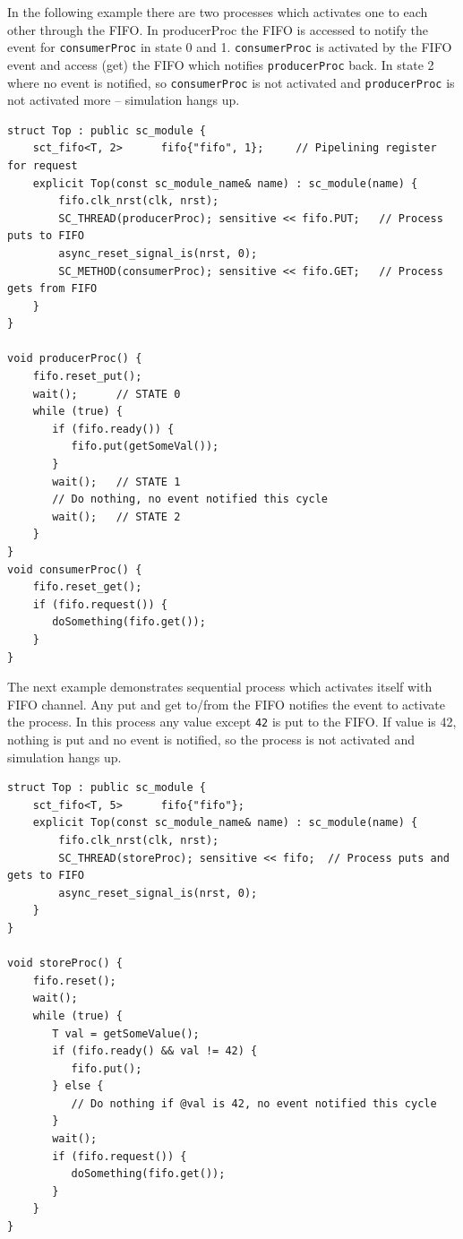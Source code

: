 In the following example there are two processes which activates one to each other through the FIFO. In producerProc the FIFO is accessed to notify the event for {\tt consumerProc} in state 0 and 1. {\tt consumerProc} is activated by the FIFO event and access (get) the FIFO which notifies {\tt producerProc} back. In state 2 where no event is notified, so {\tt consumerProc} is not activated and {\tt producerProc} is not activated more -- simulation hangs up.

\begin{lstlisting}[style=mycpp]
struct Top : public sc_module {
    sct_fifo<T, 2>      fifo{"fifo", 1};     // Pipelining register for request
    explicit Top(const sc_module_name& name) : sc_module(name) {
        fifo.clk_nrst(clk, nrst);
        SC_THREAD(producerProc); sensitive << fifo.PUT;   // Process puts to FIFO
        async_reset_signal_is(nrst, 0);
        SC_METHOD(consumerProc); sensitive << fifo.GET;   // Process gets from FIFO   
    } 
}

void producerProc() {
    fifo.reset_put();
    wait();      // STATE 0
    while (true) {
       if (fifo.ready()) {           
          fifo.put(getSomeVal());
       }
       wait();   // STATE 1
       // Do nothing, no event notified this cycle
       wait();   // STATE 2
    }
}
void consumerProc() {
    fifo.reset_get();
    if (fifo.request()) {
       doSomething(fifo.get());
    }
}
\end{lstlisting}

The next example demonstrates sequential process which activates itself with FIFO channel. Any put and get to/from the FIFO notifies the event to activate the process. In this process any value except {\tt 42} is put to the FIFO. If value is 42, nothing is put and no event is notified, so the process is not activated and simulation hangs up.

\begin{lstlisting}[style=mycpp]
struct Top : public sc_module {
    sct_fifo<T, 5>      fifo{"fifo"};
    explicit Top(const sc_module_name& name) : sc_module(name) {
        fifo.clk_nrst(clk, nrst);
        SC_THREAD(storeProc); sensitive << fifo;  // Process puts and gets to FIFO
        async_reset_signal_is(nrst, 0);
    }
}

void storeProc() {
    fifo.reset();
    wait();
    while (true) {
       T val = getSomeValue();
       if (fifo.ready() && val != 42) {   
          fifo.put();
       } else {
          // Do nothing if @val is 42, no event notified this cycle
       }  
       wait();
       if (fifo.request()) {
          doSomething(fifo.get());
       }
    }
}
\end{lstlisting}

